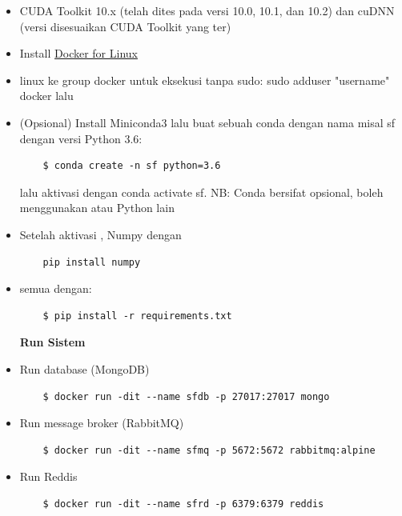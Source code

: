 \begin{itemize}
  \item CUDA Toolkit 10.x (telah dites pada versi 10.0, 10.1, dan 10.2) dan cuDNN (versi disesuaikan CUDA Toolkit yang ter)
  \item Install \href{https://docs.docker.com/engine/install/ubuntu/}{Docker for Linux}
  \item {} linux ke group docker untuk eksekusi tanpa sudo: sudo adduser "username" docker lalu 
  \item (Opsional) Install Miniconda3 lalu buat sebuah conda  dengan nama misal sf dengan versi Python 3.6:
  
  \begin{lstlisting}
    $ conda create -n sf python=3.6
  \end{lstlisting}

  lalu aktivasi dengan conda activate sf.
  NB: Conda bersifat opsional, boleh menggunakan  atau  Python lain

  \item Setelah aktivasi ,  Numpy dengan
  \begin{lstlisting}
    pip install numpy
  \end{lstlisting}  

  \item {} semua  dengan:
  
  \begin{lstlisting}
    $ pip install -r requirements.txt
  \end{lstlisting}

  \textbf{Run Sistem}
  \item Run database (MongoDB)
  
  \begin{lstlisting}
    $ docker run -dit --name sfdb -p 27017:27017 mongo
  \end{lstlisting}

  \item Run message broker (RabbitMQ)
  
  \begin{lstlisting}
    $ docker run -dit --name sfmq -p 5672:5672 rabbitmq:alpine
  \end{lstlisting}

  \item Run Reddis
  
  \begin{lstlisting}
    $ docker run -dit --name sfrd -p 6379:6379 reddis
  \end{lstlisting}


\end{itemize}
